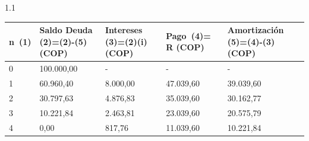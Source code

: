 	\begin{center}
	\begin{spacing}{1.1}
		\begin{tabular}{|p{1cm}|p{2cm}|p{2cm}|p{2cm}|p{3cm}|}
			\hline
			\rowcolor[HTML]{FFB183}
			\textbf{n\ (1)} & \textbf{Saldo Deuda (2)=(2)-(5) (COP)} & \textbf{Intereses  (3)=(2)(i) (COP)} & \textbf{Pago\ (4)= R (COP)  } & \textbf{Amortización  (5)=(4)-(3) (COP)} \\ \hline
			
			0               &   100{.}000,00                     & -                     & -               & -                         \\ \hline
			1               &   60{.}960,40                      &    8{.}000,00                    &  47{.}039,60             &   39{.}039,60                        \\ \hline
			2               &   30{.}797,63                      &    4{.}876,83                    &  35{.}039,60             &   30{.}162,77                        \\ \hline
			3               &   10{.}221,84                      &   2{.}463,81                     &   23.039,60             &   20{.}575,79                        \\ \hline
			4               &   0,00                           &   817,76                       &   11{.}039,60             &   10{.}221,84                        \\ \hline
		\end{tabular}
	\end{spacing}
\end{center}
